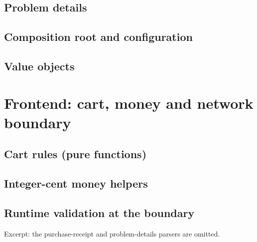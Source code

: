 \documentclass[11pt,a4paper]{article}
\begin{document}


\subsection{Problem details}



\newpage
\subsection{Composition root and configuration}





\subsection{Value objects}





\newpage
\section{Frontend: cart, money and network boundary}

\subsection{Cart rules (pure functions)}



\subsection{Integer-cent money helpers}



\newpage
\subsection{Runtime validation at the boundary}

Excerpt: the purchase-receipt and problem-details parsers are omitted.
\end{document}
